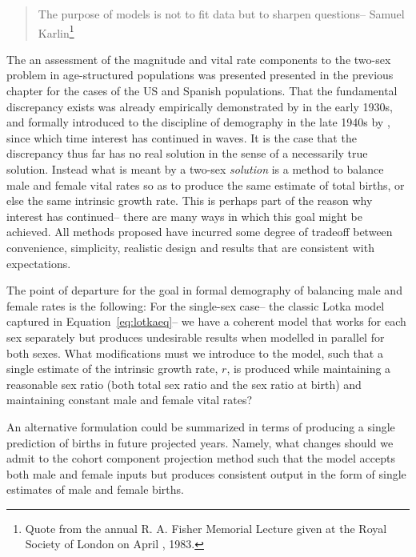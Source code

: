  \FloatBarrier

\begin{singlespace}
\begin{quote}
The purpose of models is not to fit data but to sharpen questions-- Samuel
Karlin\footnote{Quote from the  annual R. A. Fisher Memorial Lecture
given at the Royal Society of London on April , 1983.}
\end{quote}
\end{singlespace}

The an assessment of the magnitude and vital rate components to the two-sex
problem in age-structured populations was presented presented in the previous
chapter for the cases of the US and Spanish populations. That the fundamental
discrepancy exists was already empirically demonstrated by
\citet{kuczynski1932fertility} in the early 1930s, and formally introduced to
the discipline of demography in the late 1940s by \citet{karmel1947relations},
since which time interest has continued in waves. It is the case that the
discrepancy thus far has no real solution in the sense of a necessarily true
solution. Instead what is meant by a two-sex \textit{solution} is a method to
balance male and female vital rates so as to produce the same estimate of
total births, or else the same intrinsic growth rate. This is perhaps part of
the reason why interest has continued-- there are many ways in which this goal
might be achieved. All methods proposed have incurred some degree of tradeoff
between convenience, simplicity, realistic design and results that are
consistent with expectations.
 
The point of departure for the goal in formal demography of balancing male and
female rates is the following: For the single-sex case-- the classic Lotka
model captured in Equation~\eqref{eq:lotkaeq}-- we have a coherent model that
works for each sex separately but produces undesirable results when modelled in parallel for both
sexes. What modifications must we introduce to the model, such that a single
estimate of the intrinsic growth rate, $r$, is produced while maintaining a
reasonable sex ratio (both total sex ratio and the sex ratio at birth) and
maintaining constant male and female vital rates? 

An alternative formulation
could be summarized in terms of producing a single prediction of births in
future projected years. Namely, what changes should we admit to the cohort
component projection method such that the model accepts both male and
female inputs but produces consistent output in the form of single estimates of
male and female births.


 
 
 
 
 
\FloatBarrier